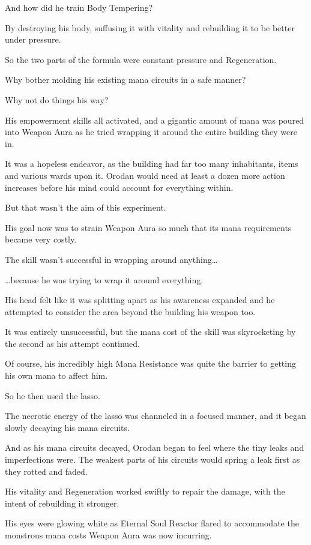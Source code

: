 \documentclass[a4paper,10pt]{book}
\begin{document}
And how did he train Body Tempering?\par
By destroying his body, suffusing it with vitality and rebuilding it to be better under pressure.\par
So the two parts of the formula were constant pressure and Regeneration.\par
Why bother molding his existing mana circuits in a safe manner?\par
Why not do things his way?\par
His empowerment skills all activated, and a gigantic amount of mana was poured into Weapon Aura as he tried wrapping it around the entire building they were in.\par
It was a hopeless endeavor, as the building had far too many inhabitants, items and various wards upon it. Orodan would need at least a dozen more action increases before his mind could account for everything within.\par
But that wasn’t the aim of this experiment.\par
His goal now was to strain Weapon Aura so much that its mana requirements became very costly.\par
The skill wasn’t successful in wrapping around anything…\par
…because he was trying to wrap it around everything.\par
His head felt like it was splitting apart as his awareness expanded and he attempted to consider the area beyond the building his weapon too.\par
It was entirely unsuccessful, but the mana cost of the skill was skyrocketing by the second as his attempt continued.\par
Of course, his incredibly high Mana Resistance was quite the barrier to getting his own mana to affect him.\par
So he then used the lasso.\par
The necrotic energy of the lasso was channeled in a focused manner, and it began slowly decaying his mana circuits.\par
And as his mana circuits decayed, Orodan began to feel where the tiny leaks and imperfections were. The weakest parts of his circuits would spring a leak first as they rotted and faded.\par
His vitality and Regeneration worked swiftly to repair the damage, with the intent of rebuilding it stronger.\par
His eyes were glowing white as Eternal Soul Reactor flared to accommodate the monstrous mana costs Weapon Aura was now incurring.\par
\end{document}
